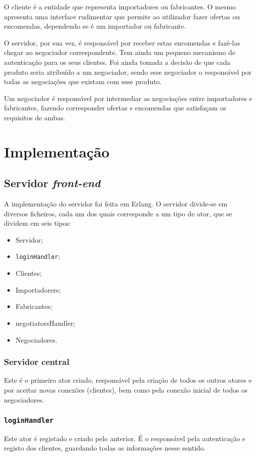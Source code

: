 \documentclass[a4paper]{report}
\begin{document}
	O cliente é a entidade que representa importadores ou fabricantes. 
	O mesmo apresenta uma interface rudimentar que permite ao utilizador fazer ofertas ou encomendas, dependendo se é um importador ou fabricante.
	
	O servidor, por sua vez, é responsável por receber estas encomendas e fazê-las chegar ao negociador correspondente. Tem ainda um pequeno mecanismo de autenticação para os seus clientes.
	Foi ainda tomada a decisão de que cada produto seria atribuído a um negociador, sendo esse negociador o responsável por todas as negociações que existam com esse produto.
	
	Um negociador é responsável por intermediar as negociações entre importadores e fabricantes, fazendo corresponder ofertas e encomendas que satisfaçam os requisitos de ambas.


	\section{Implementação}
	
	\subsection{Servidor \textit{front-end}}
	A implementação do servidor foi feita em Erlang. O servidor divide-se em diversos ficheiros, cada um dos quais corresponde a um tipo de ator, que se dividem em seis tipos:
	\begin{itemize}
		\item Servidor;
		\item \texttt{loginHandler};
		\item Clientes;
		\item Importadorers;
		\item Fabricantes;
		\item negotiatorsHandler;
		\item Negociadores.
	\end{itemize}

	\subsubsection{Servidor central}
	Este é o primeiro ator criado, responsável pela criação de todos os outros atores e por aceitar novas conexões (clientes), bem como pela conexão inicial de todos os negociadores.

	\subsubsection{\texttt{loginHandler}}
	Este ator é registado e criado pelo anterior. É o responsável pela autenticação e registo dos clientes, guardando todas as informações nesse sentido.
\end{document}
